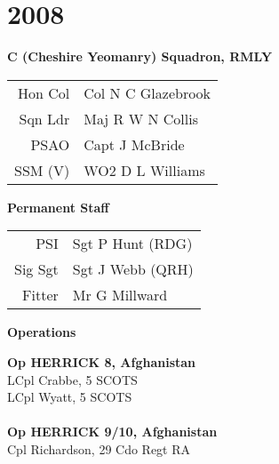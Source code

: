 \chapter*{2008}

\vspace*{10mm}

\begin{center}
  \Large
  \textbf{C (Cheshire Yeomanry) Squadron, RMLY}
\end{center}

\begin{center}
  \begin{tabular}{rl}
    Hon Col & Col N C Glazebrook \\
    Sqn Ldr & Maj R W N Collis \\
    PSAO & Capt J McBride \\
    SSM (V) & WO2 D L Williams \\
  \end{tabular}
\end{center}

\begin{center}
  \Large
  \textbf{Permanent Staff}
\end{center}

\begin{center}
  \begin{tabular}{rl}
    PSI & Sgt P Hunt (RDG) \\
    Sig Sgt & Sgt J Webb (QRH) \\
    Fitter & Mr G Millward \\
  \end{tabular}
\end{center}

\vspace*{5mm}

\begin{center}
  \Large
  \textbf{Operations}
\end{center}

\begin{multicols}{2}
  \noindent
  \textbf{Op HERRICK 8, Afghanistan} \\
  LCpl Crabbe, 5 SCOTS \\
  LCpl Wyatt, 5 SCOTS \\
  \\
  \textbf{Op HERRICK 9/10, Afghanistan} \\
  Cpl Richardson, 29 Cdo Regt RA \\
\end{multicols}


